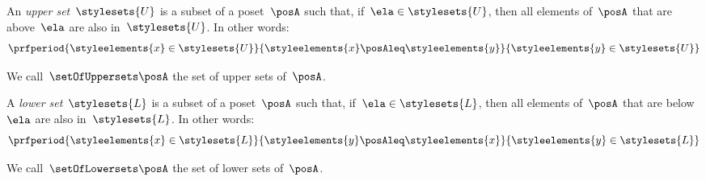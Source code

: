
\begin{definition}
	\label{def:upperset}
	An \emph{upper set}~$\stylesets{U}$ is a subset of a poset~$\posA$ such that, if~$\ela \in \stylesets{U}$, then all elements of~$\posA$ that are above~$\ela$ are also in~$\stylesets{U}$.
	In other words:
	\begin{equation}
		\prfperiod{\styleelements{x}\in \stylesets{U}}{\styleelements{x}\posAleq \styleelements{y}}{\styleelements{y}\in \stylesets{U}}
	\end{equation}
\end{definition}
We call~$\setOfUppersets \posA$ the set of upper sets of~$\posA$.

\begin{definition}
	\label{def:lowerset}
	A \emph{lower set}~$\stylesets{L}$ is a subset of a poset~$\posA$ such that, if~$\ela \in \stylesets{L}$, then all elements of~$\posA$ that are below~$\ela$ are also in~$\stylesets{L}$.
	In other words:
	\begin{equation}
		\prfperiod{\styleelements{x}\in \stylesets{L}}{\styleelements{y}\posAleq \styleelements{x}}{\styleelements{y}\in \stylesets{L}}
	\end{equation}
\end{definition}
We call~$\setOfLowersets \posA$ the set of lower sets of~$\posA$.
%

\begin{marginfigure}
	\begin{center}
	\end{center}
	\caption{\label{fig:upperset}}
\end{marginfigure}

